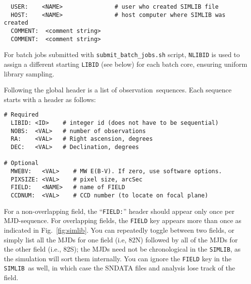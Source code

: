 \documentclass[12pt]{article}
\newcommand{\simlib}{{\tt SIMLIB}}
\newcommand{\obs}{observation}
\newcommand{\submit}{\tt submit\_batch\_jobs.sh}
\begin{document}
{\begin{verbatim}
  USER:    <NAME>               # user who created SIMLIB file
  HOST:    <NAME>               # host computer where SIMLIB was created
  COMMENT:  <comment string>
  COMMENT:  <comment string>
\end{verbatim} 
%
For batch jobs submitted with {\submit} script,
{\tt NLIBID} is used to assign a different starting {\tt LIBID}
(see below) for each batch core, ensuring uniform library sampling.

\clearpage
Following the global header is a list of \obs\ sequences.
Each sequence starts with a header as follows:
\begin{verbatim}
# Required
  LIBID: <ID>    # integer id (does not have to be sequential)
  NOBS:  <VAL>   # number of observations
  RA:    <VAL>   # Right ascension, degrees
  DEC:   <VAL>   # Declination, degrees

# Optional
  MWEBV:   <VAL>    # MW E(B-V). If zero, use software options.
  PIXSIZE: <VAL>    # pixel size, arcSec
  FIELD:   <NAME>   # name of FIELD
  CCDNUM:  <VAL>    # CCD number (to locate on focal plane)
\end{verbatim}
%
For a non-overlapping field, the ``{\tt FIELD:}'' header should appear
only once per MJD-sequence. For overlapping fields, 
the {\tt FIELD} key appears more than once as indicated
in Fig.~\ref{fig:simlib}.  You can repeatedly toggle between two fields, 
or simply list all the MJDs for one field (i.e, 82N) followed by all 
of the MJDs for the other field (i.e., 82S);
the MJDs need not be chronological in the \simlib, as the simulation
will sort them internally. You can ignore the {\tt FIELD} key in the
\simlib\ as well, in which case the SNDATA files and analysis lose
track of the field.


}
\end{document}
